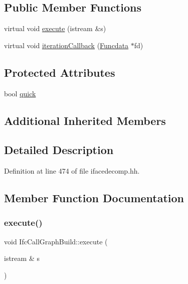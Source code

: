 \subsection*{Public Member Functions}
\begin{DoxyCompactItemize}
\item 
virtual void \mbox{\hyperlink{class_ifc_call_graph_build_abe1d0338026fa9dd6bcf466e12e0fed1}{execute}} (istream \&s)
\item 
virtual void \mbox{\hyperlink{class_ifc_call_graph_build_a141d9fa5d5f44124c3baadd825a7d658}{iteration\+Callback}} (\mbox{\hyperlink{class_funcdata}{Funcdata}} $\ast$fd)
\end{DoxyCompactItemize}
\subsection*{Protected Attributes}
\begin{DoxyCompactItemize}
\item 
bool \mbox{\hyperlink{class_ifc_call_graph_build_a8ed330d968150ce54b6dcf6643277b19}{quick}}
\end{DoxyCompactItemize}
\subsection*{Additional Inherited Members}


\subsection{Detailed Description}


Definition at line 474 of file ifacedecomp.\+hh.



\subsection{Member Function Documentation}
\mbox{\label{class_ifc_call_graph_build_abe1d0338026fa9dd6bcf466e12e0fed1}} 
\subsubsection{\texorpdfstring{execute()}{execute()}}
{\footnotesize\ttfamily void Ifc\+Call\+Graph\+Build\+::execute (\begin{DoxyParamCaption}\item[{istream \&}]{s }\end{DoxyParamCaption})\hspace{0.3cm}{\ttfamily [virtual]}}



